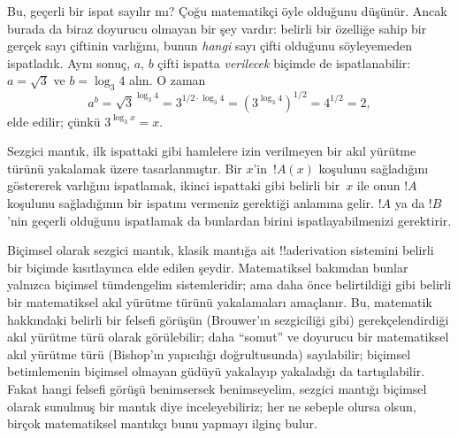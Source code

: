 Bu, geçerli bir ispat sayılır mı? Çoğu matematikçi öyle olduğunu düşünür.
Ancak burada da biraz doyurucu olmayan bir şey vardır: belirli bir özelliğe
sahip bir gerçek sayı çiftinin varlığını, bunun \emph{hangi} sayı çifti
olduğunu söyleyemeden ispatladık. Aynı sonuç, $a$, $b$ çifti ispatta
\emph{verilecek} biçimde de ispatlanabilir: $a = \sqrt{3}$ ve $b = \log_3 4$
alın. O zaman
\[
a^b = \sqrt{3}^{\log_3 4} = 3^{1/2 \cdot \log_3 4} = (3^{\log_3
  4})^{1/2} = 4^{1/2}= 2,
\]
elde edilir; çünkü $3^{\log_3 x} = x$.

Sezgici mantık, ilk ispattaki gibi hamlelere izin verilmeyen bir akıl yürütme
türünü yakalamak üzere tasarlanmıştır. Bir $x$'in~$!A(x)$ koşulunu sağladığını
göstererek varlığını ispatlamak, ikinci ispattaki gibi belirli bir~$x$ ile onun $!A$
koşulunu sağladığının bir ispatını vermeniz gerektiği anlamına gelir. $!A$ ya
da $!B$'nin geçerli olduğunu ispatlamak da bunlardan birini ispatlayabilmenizi
gerektirir.

Biçimsel olarak sezgici mantık, klasik mantığa ait !!a{derivation} sistemini
belirli bir biçimde kısıtlayınca elde edilen şeydir. Matematiksel bakımdan
bunlar yalnızca biçimsel tümdengelim sistemleridir; ama daha önce belirtildiği
gibi belirli bir matematiksel akıl yürütme türünü yakalamaları amaçlanır. Bu,
matematik hakkındaki belirli bir felsefi görüşün (Brouwer'ın sezgiciliği gibi)
gerekçelendirdiği akıl yürütme türü olarak görülebilir; daha ``somut'' ve
doyurucu bir matematiksel akıl yürütme türü (Bishop'ın yapıcılığı doğrultusunda)
sayılabilir; biçimsel betimlemenin biçimsel olmayan güdüyü yakalayıp
yakaladığı da tartışılabilir. Fakat hangi felsefi görüşü benimsersek
benimseyelim, sezgici mantığı biçimsel olarak sunulmuş bir mantık diye
inceleyebiliriz; her ne sebeple olursa olsun, birçok matematiksel mantıkçı bunu
yapmayı ilginç bulur.


